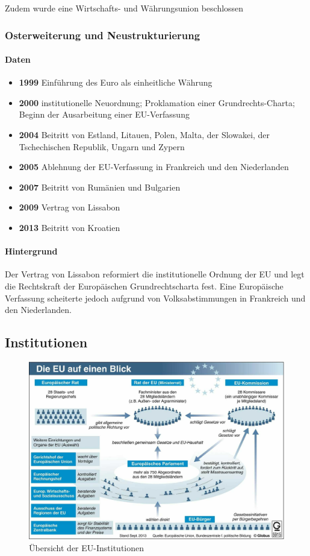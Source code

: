 \documentclass{article}
\begin{document}
	Zudem wurde eine Wirtschafts- und Währungsunion beschlossen

	\subsubsection{Osterweiterung und Neustrukturierung}
	\paragraph{Daten}
	\begin{itemize}
		\item \textbf{1999} Einführung des Euro als einheitliche Währung
		\item \textbf{2000} institutionelle Neuordnung; Proklamation einer Grundrechts-Charta; Beginn der Ausarbeitung einer EU-Verfassung
		\item \textbf{2004} Beitritt von Estland, Litauen, Polen, Malta, der Slowakei, der Tschechischen Republik, Ungarn und Zypern
		\item \textbf{2005} Ablehnung der EU-Verfassung in Frankreich und den Niederlanden
		\item \textbf{2007} Beitritt von Rumänien und Bulgarien
		\item \textbf{2009} Vertrag von Lissabon
		\item \textbf{2013} Beitritt von Kroatien
	\end{itemize}

	\paragraph{Hintergrund}
	Der Vertrag von Lissabon reformiert die institutionelle Ordnung der EU und legt die Rechtskraft der Europäischen Grundrechtscharta fest. Eine Europäische Verfassung scheiterte jedoch aufgrund von Volksabstimmungen in Frankreich und den Niederlanden.

	\subsection{Institutionen}

	\begin{figure}[!ht]
		\centering
  		\includegraphics[width=45em]{eu_institutionen.jpg}
  		\caption{Übersicht der EU-Institutionen}
  		\label{fig:eu_institutionen}
	\end{figure}
	
\end{document}
